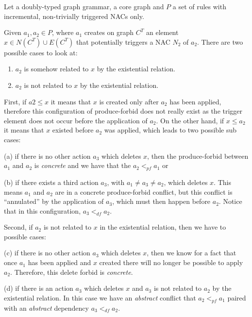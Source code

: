 \begin{definition} Let \doublyTypedGraphGrammarCore{} a doubly-typed graph grammar, \coreGraph{} a core graph and $P$ a set of rules with incremental, non-trivially triggered NACs only.

  Given $a_1,a_2 \in P$, where $a_1$ creates on graph $C^T$ an element $x \in N(C^T) \cup E(C^T)$ that potentially triggers a NAC $N_2$ of $a_2$. There are two possible cases to look at:

  \begin{enumerate}
    \item $a_2$ is somehow related to $x$ by the existential relation.
    \item $a_2$ is not related to $x$ by the existential relation.
  \end{enumerate}

  First, if $a2 \leq x$ it means that $x$ is created only after $a_2$ has been applied, therefore this configuration of produce-forbid does not really exist as the trigger element does not occur before the application of $a_2$. On the other hand, if $x \leq a_2$ it means that $x$ existed before $a_2$ was applied, which leads to two possible sub cases: 
  
  (a) if there is no other action $a_3$ which deletes $x$, then the produce-forbid between $a_1$ and $a_2$ is \emph{concrete} and we have
  that the $a_2 <_{pf} a_1$ or 
  
  (b) if there exists a third action $a_3$, with $a_1 \ne a_3 \ne a_2$, which deletes $x$. This means $a_1$ and $a_2$ are in a concrete produce-forbid conflict, but this conflict is ``annulated'' by the application of $a_3$, which must then happen before $a_2$. Notice that in this configuration, $a_3 <_{df} a_2$.

  Second, if $a_2$ is not related to $x$ in the existential relation, then we have to possible cases:

  (c) if there is no other action $a_3$ which deletes $x$, then we know for a fact that once $a_1$ has been applied and $x$ created there will no longer be possible to apply $a_2$. Therefore, this delete forbid is \emph{concrete}.

  (d) if there is an action $a_3$ which deletes $x$ and $a_3$ is not related to $a_2$ by the existential relation. In this case we have an \emph{abstract} conflict that $a_2 <_{pf} a_1$ paired with an \emph{abstract} dependency $a_3 <_{df} a_2$.
\end{definition}

